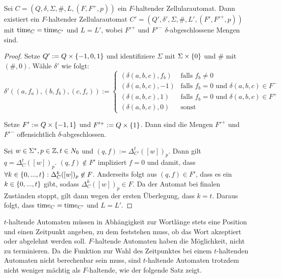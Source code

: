 \begin{lemma}
    \label{lemmaAbgeschlosseneMenge}
    
    Sei $C = (Q, \delta, \Sigma, \#, L, (F, F^+, p))$ ein $F$-haltender Zellularautomat.
    Dann existiert ein $F$-haltender Zellularautomat $C' = (Q', \delta', \Sigma, \#, L', (F', F'^+, p))$ mit $\operatorname{time}_{C} = \operatorname{time}_{C'}$ und $L = L'$,
    wobei $F'^+$ und $F'^-$ $\delta$-abgeschlossene Mengen sind.
\end{lemma}
\begin{proof}
    Setze $Q' := Q \times \{ {{-1}, 0, 1} \}$ und identifiziere $\Sigma$ mit $\Sigma \times \{ {0} \}$ und $\#$ mit $(\#, 0)$.
    Wähle $\delta'$ wie folgt:
    \[
       \delta'((a, f_a), (b, f_b), (c, f_c)) :=
       \begin{cases}
         (\delta(a, b, c), f_b)  & \text{falls } f_b \neq 0 \\
         (\delta(a, b, c), {-1}) & \text{falls } f_b = 0 \text{ und } \delta(a, b, c) \in F^- \\
         (\delta(a, b, c), {1}) & \text{falls } f_b = 0 \text{ und }  \delta(a, b, c) \in F^+ \\
         (\delta(a, b, c), {0}) & \text{sonst}
       \end{cases}
    \]
    
    Setze $F' := Q \times \{ {{-1}, 1} \}$ und $F'^+ := Q \times \{ {1} \}$.
    Dann sind die Mengen $F'^+$ und $F'^-$ offensichtlich $\delta$-abgeschlossen.
    
    Sei $w \in \Sigma^*, p \in \mathbb{Z}, t \in N_0$ und $(q, f) := \Delta_{C'}^t([w])_p$.
    Dann gilt $q = \Delta_{C}^t([w])_p$. $(q, f) \not\in F'$ impliziert $f = 0$ und damit, dass $\forall k \in \{ { 0, ..., t } \}: \Delta_{C}^k([w])_p \not\in F$.
    Anderseits folgt aus $(q, f) \in F'$, dass es ein $k \in \{ {0, ...,  t} \}$ gibt, sodass $\Delta_{C}^k([w])_p \in F$.
    Da der Automat bei finalen Zuständen stoppt, gilt dann wegen der ersten Überlegung, dass $k = t$.
    Daraus folgt, dass $\operatorname{time}_{C} = \operatorname{time}_{C'}$ und $L = L'$.
\end{proof}


$t$-haltende Automaten müssen in Abhängigkeit zur Wortlänge stets eine Position und einen Zeitpunkt angeben,
zu dem feststehen muss, ob das Wort akzeptiert oder abgelehnt werden soll.
$F$-haltende Automaten haben die Möglichkeit, nicht zu terminieren.
Da die Funktion zur Wahl des Zeitpunktes bei einem $t$-haltenden Automaten nicht berechenbar sein muss,
sind $t$-haltende Automaten trotzdem nicht weniger mächtig als $F$-haltende, wie der folgende Satz zeigt.

